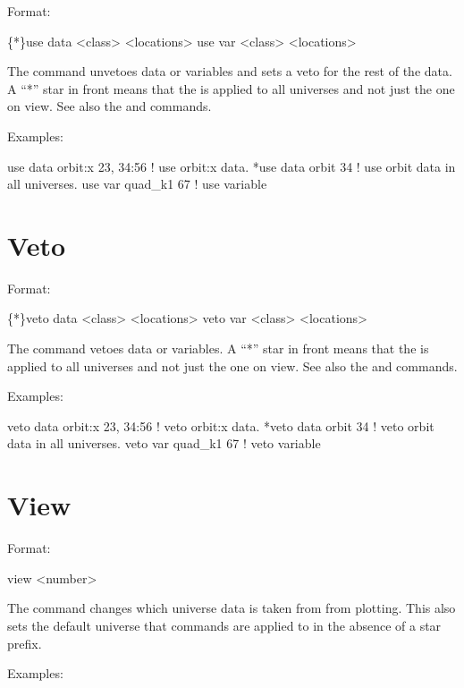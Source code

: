 Format:
\begin{example}
  \{*\}use data  <class> <locations>
  use var <class> <locations>
\end{example}

\vskip 0.2in The  command  unvetoes data or variables
and sets a veto for the rest of the data.
A ``*'' star in front means that the  is applied
to all universes and not just the one on view. See also the 
and  commands.

Examples:
\begin{example}
  use data orbit:x  23, 34:56 ! use orbit:x data.
  *use data orbit 34          ! use orbit data in all universes.
  use var quad_k1 67          ! use variable
\end{example}


\section{Veto}
\label{s:veto}

Format:
\begin{example}
  \{*\}veto data  <class> <locations>
  veto var <class> <locations>
\end{example}

\vskip 0.2in The  command  vetoes data or variables.
A ``*'' star in front means that the  is applied
to all universes and not just the one on view. See also the 
and  commands.

Examples:
\begin{example}
  veto data orbit:x  23, 34:56 ! veto orbit:x data.
  *veto data orbit 34          ! veto orbit data in all universes.
  veto var quad_k1 67     ! veto variable
\end{example}

\section{View}
\label{s:view}

Format:
\begin{example}
  view <number>
\end{example}

\vskip 0.2in The  command changes which universe data is
taken from from plotting.  This also sets the default universe that
commands are applied to in the absence of a star prefix.  

Examples:
